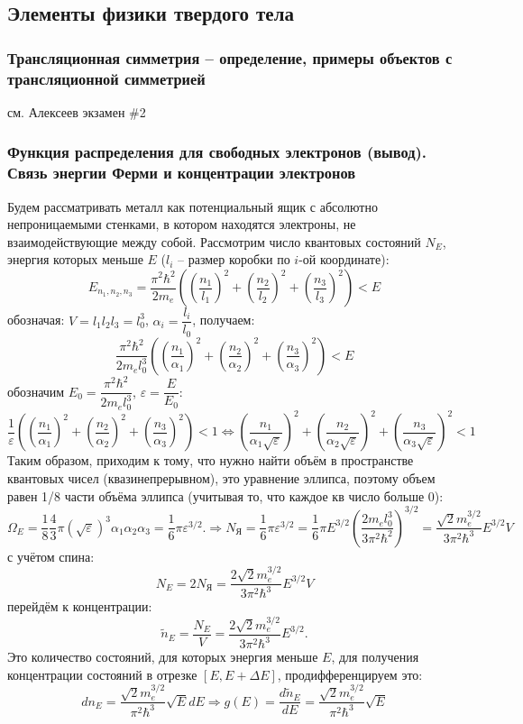\subsection{Элементы физики твердого тела}

\subsubsection{Трансляционная симметрия --  определение, примеры объектов с трансляционной симметрией}

см. Алексеев экзамен \#2

\subsubsection{Функция распределения для свободных электронов (вывод). Связь энергии Ферми и концентрации электронов}
\label{sec:free-elecs}

Будем рассматривать металл как потенциальный ящик с абсолютно непроницаемыми стенками, в 
котором находятся электроны, не взаимодействующие между собой. Рассмотрим число квантовых состояний 
$N_E$, энергия которых меньше $E$ ($l_i$ -- размер коробки по $i$-ой координате):
\[
  E_{n_1, n_2, n_3} = \dfrac{\pi^2 \hbar^2}{2 m_e} \left(
    \left( \dfrac{n_1}{l_1} \right)^2 +
    \left( \dfrac{n_2}{l_2} \right)^2 +
    \left( \dfrac{n_3}{l_3} \right)^2 \right) < E
\]
обозначая: $V = l_1 l_2 l_3 = l_0^3$, $\alpha_i = \dfrac{l_i}{l_0}$, получаем:
\[
  \dfrac{\pi^2 \hbar^2}{2 m_e l_0^3} \left(
    \left( \dfrac{n_1}{\alpha_1} \right)^2 +
    \left( \dfrac{n_2}{\alpha_2} \right)^2 +
    \left( \dfrac{n_3}{\alpha_3} \right)^2 \right) < E
\]
обозначим $E_0 = \dfrac{\pi^2 \hbar^2}{2 m_e l_0^3}$, $\varepsilon = \dfrac{E}{E_0}$:
\[
  \dfrac{1}{\varepsilon} \left(
    \left( \dfrac{n_1}{\alpha_1} \right)^2 +
    \left( \dfrac{n_2}{\alpha_2} \right)^2 +
    \left( \dfrac{n_3}{\alpha_3} \right)^2\right) < 1
  \Leftrightarrow
  \left( \dfrac{n_1}{\alpha_1 \sqrt{\varepsilon}} \right)^2 +
    \left( \dfrac{n_2}{\alpha_2 \sqrt{\varepsilon}} \right)^2 +
    \left( \dfrac{n_3}{\alpha_3 \sqrt{\varepsilon}} \right)^2 < 1
\]
Таким образом, приходим к тому, что нужно найти объём в пространстве квантовых чисел
(квазинепрерывном), это уравнение эллипса, поэтому объем равен 1/8 части объёма эллипса
(учитывая то, что каждое кв число больше 0):
\[
  \Omega_E = \dfrac{1}{8} \dfrac{4}{3} \pi (\sqrt{\varepsilon})^3 \alpha_1 \alpha_2 \alpha_3
  = \dfrac{1}{6} \pi \varepsilon^{3/2}.
  \Rightarrow
  N_\text{Я} = \dfrac{1}{6} \pi \varepsilon^{3/2}
  = \dfrac{1}{6} \pi E^{3/2} \left( \dfrac{2 m_e l_0^3}{3 \pi^2 \hbar^2} \right)^{3/2}
  = \dfrac{\sqrt{2} m_e^{3/2}}{3 \pi^2 \hbar^3} E^{3/2} V
\]
с учётом спина:
\[
  N_E = 2 N_\text{Я} = \dfrac{2 \sqrt{2} m_e^{3/2}}{3 \pi^2 \hbar^3} E^{3/2} V 
\]
перейдём к концентрации:
\[
  \tilde n_E = \dfrac{N_E}{V} = \dfrac{2 \sqrt{2} m_e^{3/2}}{3 \pi^2 \hbar^3} E^{3/2}.
\]
Это количество состояний, для которых энергия меньше $E$, для получения концентрации состояний в
отрезке $[E, E+\Delta E]$, продифференцируем это:
\[
  dn_E = \dfrac{\sqrt{2} m_e^{3/2}}{\pi^2 \hbar^3} \sqrt{E} dE
  \Rightarrow
  g(E) = \dfrac{d\tilde n_E}{dE} = \dfrac{\sqrt{2} m_e^{3/2}}{\pi^2 \hbar^3} \sqrt{E}
\]

